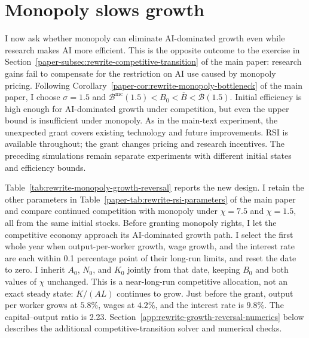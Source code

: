 \section{Monopoly slows growth}
\label{subsec:rewrite-monopoly-growth-reversal}

I now ask whether monopoly can eliminate AI-dominated growth even while
research makes AI more efficient. This is the opposite outcome to the
exercise in Section~\ref{paper-subsec:rewrite-competitive-transition}
of the main paper: research gains fail to compensate for the restriction on AI use caused by monopoly pricing.
Following Corollary~\ref{paper-cor:rewrite-monopoly-bottleneck} of the main paper, I choose
$\sigma=1.5$ and
$\mathcal B^{\mathrm{mc}}(1.5)<B_0<\overline B<\mathcal B(1.5)$.
Initial efficiency is high enough for AI-dominated growth under
competition, but even the upper bound is insufficient under monopoly.
As in the main-text experiment, the unexpected grant covers existing technology and future improvements. RSI is
available throughout; the grant changes pricing and research incentives.
The preceding simulations remain separate experiments with different initial states
and efficiency bounds.

Table~\ref{tab:rewrite-monopoly-growth-reversal} reports the new design.
I retain the other parameters in Table~\ref{paper-tab:rewrite-rsi-parameters} of the main paper
and compare continued competition with monopoly under $\chi=7.5$ and
$\chi=1.5$, all from the same initial stocks. Before granting monopoly
rights, I let the competitive economy approach its AI-dominated
growth path. I select the first whole year when output-per-worker growth,
wage growth, and the interest rate are each within 0.1 percentage point
of their long-run limits, and reset the date to zero. I inherit $A_0$,
$N_0$, and $K_0$ jointly from that date, keeping $B_0$ and both values of
$\chi$ unchanged. This is a near-long-run competitive allocation, not
an exact steady state: $K/(AL)$ continues to grow. Just before the grant,
output per worker grows at $5.8\%$, wages at $4.2\%$, and the interest
rate is $9.8\%$. The capital--output ratio is 2.23.
Section~\ref{app:rewrite-growth-reversal-numerics} below describes the additional
competitive-transition solver and numerical checks.


